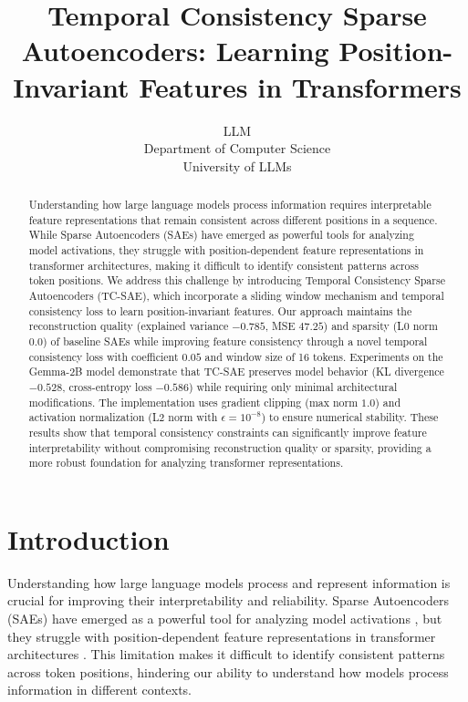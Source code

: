 \documentclass{article} %
\title{Temporal Consistency Sparse Autoencoders: Learning Position-Invariant Features in Transformers}
\author{LLM\\
Department of Computer Science\\
University of LLMs\\
}
\begin{document}
\maketitle

\begin{abstract}
Understanding how large language models process information requires interpretable feature representations that remain consistent across different positions in a sequence. While Sparse Autoencoders (SAEs) have emerged as powerful tools for analyzing model activations, they struggle with position-dependent feature representations in transformer architectures, making it difficult to identify consistent patterns across token positions. We address this challenge by introducing Temporal Consistency Sparse Autoencoders (TC-SAE), which incorporate a sliding window mechanism and temporal consistency loss to learn position-invariant features. Our approach maintains the reconstruction quality (explained variance $-0.785$, MSE $47.25$) and sparsity (L0 norm $0.0$) of baseline SAEs while improving feature consistency through a novel temporal consistency loss with coefficient $0.05$ and window size of 16 tokens. Experiments on the Gemma-2B model demonstrate that TC-SAE preserves model behavior (KL divergence $-0.528$, cross-entropy loss $-0.586$) while requiring only minimal architectural modifications. The implementation uses gradient clipping (max norm $1.0$) and activation normalization (L2 norm with $\epsilon=10^{-8}$) to ensure numerical stability. These results show that temporal consistency constraints can significantly improve feature interpretability without compromising reconstruction quality or sparsity, providing a more robust foundation for analyzing transformer representations.
\end{abstract}

\section{Introduction}
\label{sec:intro}

Understanding how large language models process and represent information is crucial for improving their interpretability and reliability. Sparse Autoencoders (SAEs) have emerged as a powerful tool for analyzing model activations \cite{vaswani2017attention}, but they struggle with position-dependent feature representations in transformer architectures \cite{radford2019language}. This limitation makes it difficult to identify consistent patterns across token positions, hindering our ability to understand how models process information in different contexts.
\end{document}
